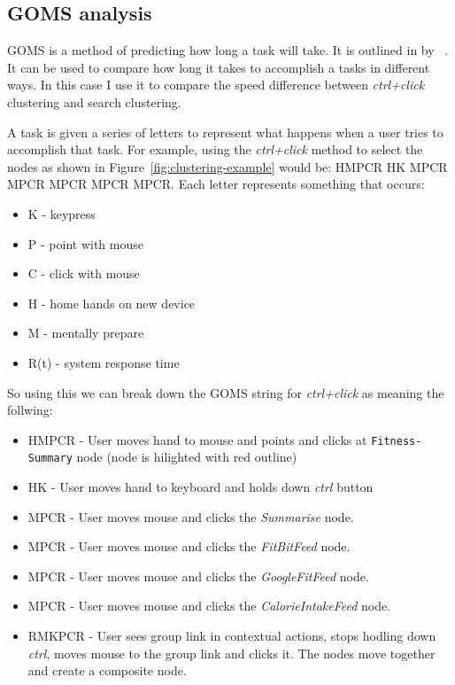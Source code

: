 \subsection{GOMS analysis}
\label{sub:goms_analysis}

GOMS is a method of predicting how long a task will take. It is outlined in  by \citeauthor{card1983psychology}~\cite{card1983psychology}. It can be used to compare how long it takes to accomplish a tasks in different ways. In this case I use it to compare the speed difference between \textit{ctrl+click} clustering and search clustering.

A task is given a series of letters to represent what happens when a user tries to accomplish that task. For example, using the \textit{ctrl+click} method to select the nodes as shown in Figure~\ref{fig:clustering-example} would be: HMPCR HK MPCR MPCR MPCR MPCR MPCR. Each letter represents something that occurs:

\begin{itemize}
\item K - keypress
\item P - point with mouse
\item C - click with mouse
\item H - home hands on new device
\item M - mentally prepare
\item R(t) - system response time
\end{itemize}

So using this we can break down the GOMS string for \textit{ctrl+click} as meaning the follwing:

\begin{itemize}
	\item HMPCR - User moves hand to mouse and points and clicks at \texttt{Fitness-Summary} node (node is hilighted with red outline)
\item HK - User moves hand to keyboard and holds down \textit{ctrl} button
\item MPCR - User moves mouse and clicks the \textit{Summarise} node.
\item MPCR - User moves mouse and clicks the \textit{FitBitFeed} node.
\item MPCR - User moves mouse and clicks the \textit{GoogleFitFeed} node.
\item MPCR - User moves mouse and clicks the \textit{CalorieIntakeFeed} node.
\item RMKPCR - User sees group link in contextual actions, stops hodling down \textit{ctrl}, moves mouse to the group link and clicks it. The nodes move together and create a composite node.
\end{itemize}

